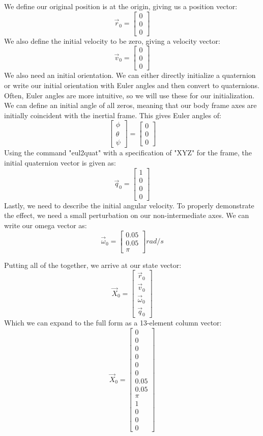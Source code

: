 \documentclass[12pt]{report}
\begin{document}
We define our original position is at the origin, giving us a position vector:
$$\vec{r}_0=\begin{bmatrix}
    0\\0\\0
\end{bmatrix}$$
We also define the initial velocity to be zero, giving a velocity vector:
$$\vec{v}_0=\begin{bmatrix}
    0\\0\\0
\end{bmatrix}$$
We also need an initial orientation. We can either directly initialize a \gls{quaternion} or write our initial orientation with \gls{Euler angles} and then convert to \glspl{quaternion}. Often, \gls{Euler angles} are more intuitive, so we will use these for our initialization. We can define an initial angle of all zeros, meaning that our \gls{body frame} axes are initially coincident with the \gls{inertial frame}. This gives \gls{Euler angles} of:
$$\begin{bmatrix}
    \phi\\\theta\\\psi
\end{bmatrix} =
\begin{bmatrix}
    0\\0\\0
\end{bmatrix}$$
Using the command "eul2quat" with a specification of "XYZ" for the frame, the initial \gls{quaternion} vector is given as:
$$\vec{q}_0=\begin{bmatrix}
    1\\0\\0\\0
\end{bmatrix}$$
Lastly, we need to describe the initial angular velocity. To properly demonstrate the effect, we need a small perturbation on our non-intermediate axes. We can write our omega vector as:
$$\vec{\omega}_0=\begin{bmatrix}
0.05\\0.05\\\pi
\end{bmatrix} rad/s$$

Putting all of the together, we arrive at our \gls{state vector}:
$$\vec{X}_0=\begin{bmatrix}
    \vec{r}_0\\\vec{v}_0\\\vec{\omega}_0\\\vec{q}_0
\end{bmatrix}$$
Which we can expand to the full form as a 13-element column vector:
$$\vec{X}_0=\begin{bmatrix}
    0\\0\\0\\0\\0\\0\\0.05\\0.05\\\pi\\1\\0\\0\\0
\end{bmatrix}$$
\end{document}
